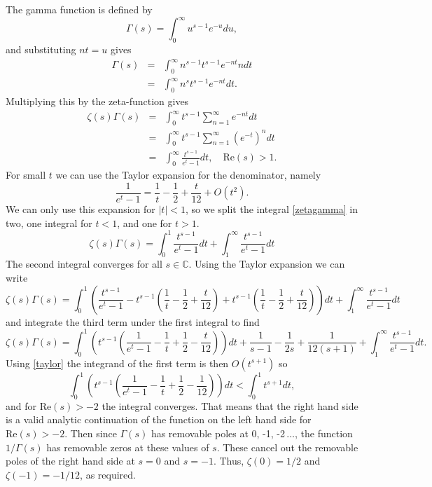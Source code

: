 \documentclass[a4paper,12pt]{article}
\numberwithin{equation}{section}
\begin{document}
The gamma function is defined by
\begin{equation}
\Gamma(s) = \int_0^\infty u^{s-1}e^{-u}du,
\end{equation}
and substituting $nt=u$ gives
\begin{eqnarray}
\Gamma(s) &=& \int_0^\infty n^{s-1}t^{s-1}e^{-nt}ndt\nonumber\\
&=&\int_0^\infty n^{s}t^{s-1}e^{-nt}dt.
\end{eqnarray}
Multiplying this by the zeta-function gives
\begin{eqnarray}
\zeta(s)\Gamma(s) &=& \int_0^\infty t^{s-1}\sum_{n=1}^\infty e^{-nt}dt\nonumber\\
&=& \int_0^\infty t^{s-1}\sum_{n=1}^\infty (e^{-t})^ndt\nonumber\\
&=& \int_0^\infty \frac{t^{s-1}}{e^t-1}dt, \quad \text{Re}(s)>1\label{zetagamma}.
\end{eqnarray}
For small $t$ we can use the Taylor expansion for the denominator, namely
\begin{equation}\label{taylor}
\frac{1}{e^t-1} = \frac 1 t -\frac 1 2 + \frac t {12} + O(t^2).
\end{equation}
We can only use this expansion for $|t|<1$, so we split the integral \ref{zetagamma} in two, one integral for $t<1$, and one for $t>1$.
\begin{equation}
\zeta(s)\Gamma(s) = \int_0^1\frac{t^{s-1}}{e^t-1}dt + \int_1^\infty\frac{t^{s-1}}{e^t-1}dt
\end{equation}
The second integral converges for all $s\in\mathbb{C}$. Using the Taylor expansion we can write
\begin{equation}
\zeta(s)\Gamma(s) = \int_0^1\left(\frac{t^{s-1}}{e^t-1} -t^{s-1}\left(\frac1 t -\frac 1 2 +\frac t {12}\right) + t^{s-1}\left(\frac1 t -\frac 1 2 +\frac t {12}\right) \right)dt + \int_1^\infty\frac{t^{s-1}}{e^t-1}dt
\end{equation}
and integrate the third term under the first integral to find
\begin{equation}
\zeta(s)\Gamma(s) = \int_0^1\left(t^{s-1}\left(\frac{1}{e^t-1}- \frac1 t +\frac 1 2 -\frac t {12}\right)\right)dt + \frac1 {s-1} -\frac 1 {2s} +\frac 1 {12(s+1)} + \int_1^\infty\frac{t^{s-1}}{e^t-1}dt.
\end{equation}
Using \ref{taylor} the integrand of the first term is then $O(t^{s+1})$ so 
\begin{equation}
\int_0^1\left(t^{s-1}\left(\frac{1}{e^t-1}- \frac1 t +\frac 1 2 -\frac 1 {12}\right)\right)dt < \int_0^1 t^{s+1}dt,
\end{equation}
and for $\text{Re}(s)>-2$ the integral converges. That means that the right hand side is a valid analytic continuation of the function on the left hand side for $\text{Re}(s)>-2$. Then since $\Gamma(s)$ has removable poles at 0, -1, -2$\,\dots$, the function $1/\Gamma(s)$ has removable zeros at these values of $s$. These cancel out the removable poles of the right hand side at $s=0$ and $s=-1$. Thus, $\zeta(0) = 1/2$ and $\zeta(-1)=-1/12$, as required.
\end{document}
